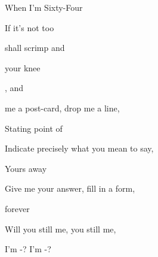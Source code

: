 \begin{SBSong}{When I'm Sixty-Four}
\begin{SBVerse}
    If it's not too 
    
     shall scrimp and 
    
      your knee
    
    ,  and  
  \end{SBVerse}
  \begin{SBVerse}
     me a post-card, drop me a line,
    
    Stating point of 
    
    Indicate precisely what you mean to say,
    
    Yours   away
    
    Give me your answer, fill in a form,
    
     forever 
    
    Will you still  me,  you still  me,
    
     I'm -?
     I'm -?
  \end{SBVerse}
\end{SBSong}
